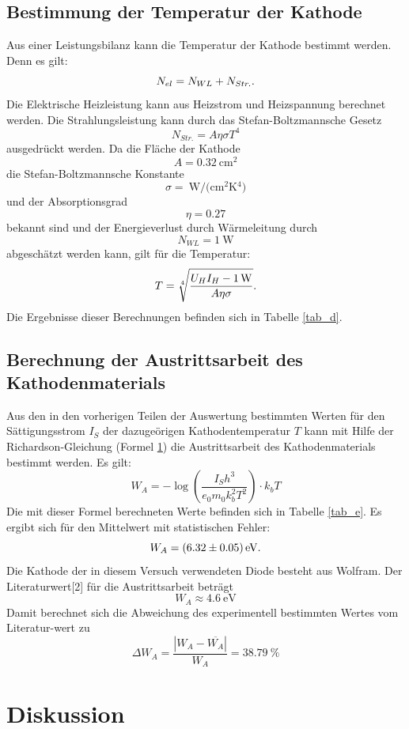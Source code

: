 \documentclass[11pt,ngerman,a4paper]{article}
\begin{document}
\subsection{Bestimmung der Temperatur der Kathode}

Aus einer Leistungsbilanz kann die Temperatur der Kathode bestimmt werden. Denn es gilt:
\[
N_{el} = N_{WL} + N_{Str.}\rm.
\]
Die Elektrische Heizleistung kann aus Heizstrom und Heizspannung berechnet werden. Die Strahlungsleistung kann durch das Stefan-Boltzmannsche Gesetz
\[
N_{Str.} = A \eta\sigma T^4
\]
ausgedrückt werden. Da die Fläche der Kathode 
\[
A = \SI{0,32}{\centi\meter\squared}
\]
die Stefan-Boltzmannsche Konstante 
\[
\sigma = \SI{}{\watt\per(\centi\meter\squared\kelvin^4)}
\]
und der Absorptionsgrad
\[
\eta = \num{0,27}
\]
bekannt sind und der Energieverlust durch Wärmeleitung durch
\[
N_{WL} = \SI{1}{\watt}
\]
abgeschätzt werden kann, gilt für die Temperatur:
\[
T = \sqrt[4]{\frac{U_H I_H - \SI{1}{\watt}}{A\eta\sigma}}\rm.
\]
Die Ergebnisse dieser Berechnungen befinden sich in Tabelle \ref{tab_d}.

\subsection{Berechnung der Austrittsarbeit des Kathodenmaterials}
Aus den in den vorherigen Teilen der Auswertung bestimmten Werten für den Sättigungsstrom $I_S$ der dazugeörigen Kathodentemperatur $T$ kann mit Hilfe der Richardson-Gleichung (Formel \ref{}) die Austrittsarbeit des Kathodenmaterials bestimmt werden. Es gilt:
\[
W_A = -\log\left( \frac{I_S h^3}{e_0 m_0 k_b^2 T^2}\right)\cdot k_b T
\]
Die mit dieser Formel berechneten Werte befinden sich in Tabelle \ref{tab_e}. Es ergibt sich für den Mittelwert mit statistischen Fehler:
\[
 W_A = \SI{6.32+-0.05}{\eV}\rm.
\]
Die Kathode der in diesem Versuch verwendeten Diode besteht aus Wolfram. Der Literaturwert[2] für die Austrittsarbeit beträgt
\[
W_A \approx \SI{4,6}{\eV}
\]
Damit berechnet sich die Abweichung des experimentell bestimmten Wertes vom Literatur-wert zu
\[
\Delta W_A = \frac{|W_A-\overline{W_A}|}{W_A} = \SI{38,79}{\percent} 
\]

\section{Diskussion}
\end{document}
